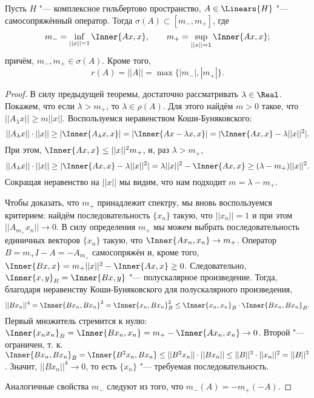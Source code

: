 \documentclass[main]{subfiles}
\begin{document}
\begin{theorem}%
  Пусть \( H \) "--- комплексное гильбертово пространство,
  \( A \in \Linears{H} \) "--- самосопряжённый оператор.
  Тогда \( \sigma(A) \subset [m_{-}, m_{+}] \),
  где
  \[
    m_{-} = \inf_{||x||=1} \Inner{Ax, x}, \qquad
    m_{+} = \sup_{||x||=1} \Inner{Ax, x};
  \]
  причём, \( m_{-}, m_{+} \in \sigma(A) \).
  Кроме того,
  \[
    r(A) = ||A|| = \max \{ |m_{-}|, |m_{+}| \}.
  \]
\end{theorem}
\begin{proof}
  В силу предыдущей теоремы, достаточно
  рассматривать \( \lambda \in \Real \).
  Покажем, что если \( \lambda > m_+ \),
  то \( \lambda \in \rho(A) \).
  Для этого найдём \( m > 0 \) такое,
  что \( ||A_\lambda x|| \ge m ||x|| \).
  Воспользуемся неравенством Коши-Буняковского:
  \[
    ||A_\lambda x|| \cdot ||x|| \ge
    |\Inner{A_\lambda x, x}| = 
    |\Inner{A x - \lambda x, x}| = 
    |\Inner{A x, x} - \lambda ||x||^2|.
  \]
  При этом, \( \Inner{A x, x} \le ||x||^2 m_+ \),
  и, раз \( \lambda > m_+ \),
  \[
    ||A_\lambda x|| \cdot ||x|| \ge
    |\Inner{Ax, x} - \lambda ||x||^2| =
    \lambda ||x||^2 - \Inner{Ax, x} \ge
    (\lambda - m_+) ||x||^2.
  \]
  Сокращая неравенство на \( ||x|| \)
  мы видим, что нам подходит
  \( m = \lambda - m_+ \).

  Чтобы доказать, что \( m_+ \) принадлежит
  спектру, мы вновь воспользуемся критерием:
  найдём последовательность \( \{ x_n \} \)
  такую, что \( ||x_n|| = 1 \) и
  при этом \( ||A_{m_+} x_n|| \to 0 \).
  В силу определения \( m_+ \) мы можем выбрать
  последовательность единичных векторов \( \{ x_n \} \)
  такую, что \( \Inner{A x_n, x_n} \to m_+ \).
  Оператор \( B = m_+ I - A = - A_{m_+} \)
  самосопряжён и, кроме того,
  \( \Inner{Bx, x} = m_+ ||x||^2 - \Inner{A x, x} \ge 0 \).
  Следовательно, \( \Inner{x, y}_B = \Inner{Bx, y} \) "---
  полускалярное произведение.
  Тогда, благодаря неравенству Коши-Буняковского для
  полускалярного произведения,
  \[
    ||B x_n||^4 = \Inner{B x_n, B x_n}^2 =
    \Inner{x_n, B x_n}_B^2 \le
    \Inner{x_n, x_n}_B \cdot \Inner{B x_n, B x_n}_B.
  \]
  Первый множитель стремится к нулю:
  \( \Inner{x_n x_n}_B = \Inner{B x_n, x_n} = 
  m_+ - \Inner{A x_n, x_n} \to 0 \).
  Второй "--- ограничен, т. к.
  \( \Inner{B x_n, B x_n}_B =
  \Inner{B^2 x_n, B x_n} \le
  ||B^2 x_n|| \cdot ||B x_n|| \le
  ||B||^3 \cdot ||x_n||^2 = ||B||^3 \).
  Значит, \( ||B x_n||^4 \to 0 \),
  то есть \( \{ x_n \} \) "--- требуемая последовательность.

  Аналогичные свойства \( m_- \) следуют из того,
  что \( m_-(A) = -m_+(-A) \).


\end{proof}
\end{document}
